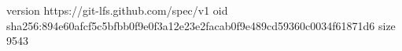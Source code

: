 version https://git-lfs.github.com/spec/v1
oid sha256:894e60afcf5c5bfbb0f9e0f3a12e23e2facab0f9e489cd59360c0034f61871d6
size 9543

